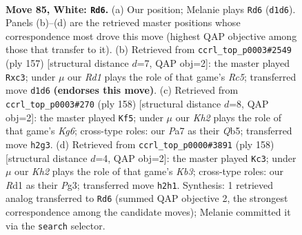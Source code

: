 \documentclass[11pt]{article}
\begin{document}
\clearpage

\begin{figure}[p]\centering
\begin{subfigure}{0.46\textwidth}\centering
\resizebox{\linewidth}{!}{%
\newchessgame
\chessboard[
  setfen={5rk1/P7/8/8/8/8/7K/3R4 w - - 39 85},
  showmover=false,
  pgfstyle=straightmove, color=movearrow, markmove={d1-d6}
]}
\caption{}
\end{subfigure}\hfill
\begin{subfigure}{0.46\textwidth}\centering
\resizebox{\linewidth}{!}{%
\newchessgame
\chessboard[
  setfen={5k2/8/8/7p/2r5/2P5/5KR1/8 b - - 0 79},
  showmover=false,
  pgfstyle=straightmove, color=movearrow, markmove={c4-c3}
]}
\caption{}
\end{subfigure}
\\[4pt]
\begin{subfigure}{0.46\textwidth}\centering
\resizebox{\linewidth}{!}{%
\newchessgame
\chessboard[
  setfen={8/8/6K1/1Q6/3kr3/8/8/8 w - - 17 80},
  showmover=false,
  pgfstyle=straightmove, color=movearrow, markmove={g6-f5}
]}
\caption{}
\end{subfigure}\hfill
\begin{subfigure}{0.46\textwidth}\centering
\resizebox{\linewidth}{!}{%
\newchessgame
\chessboard[
  setfen={2R5/7r/7k/5p2/8/1K4P1/8/8 w - - 7 80},
  showmover=false,
  pgfstyle=straightmove, color=movearrow, markmove={b3-c3}
]}
\caption{}
\end{subfigure}
\caption{\textbf{Move 85, White: \texttt{Rd6}.} (a) Our position; Melanie plays \texttt{Rd6} (\texttt{d1d6}). Panels (b)--(d) are the retrieved master positions whose correspondence most drove this move (highest QAP objective among those that transfer to it). (b) Retrieved from \texttt{ccrl\_top\_p0003\#2549} (ply 157) [structural distance $d$=7, QAP obj=2]: the master played \texttt{Rxc3}; under $\mu$ our \emph{Rd1} plays the role of that game's \emph{Rc5}; transferred move \texttt{d1d6} \textbf{(endorses this move)}. (c) Retrieved from \texttt{ccrl\_top\_p0003\#270} (ply 158) [structural distance $d$=8, QAP obj=2]: the master played \texttt{Kf5}; under $\mu$ our \emph{Kh2} plays the role of that game's \emph{Kg6}; cross-type roles: our \emph{P}a7 as their \emph{Q}b5; transferred move \texttt{h2g3}. (d) Retrieved from \texttt{ccrl\_top\_p0000\#3891} (ply 158) [structural distance $d$=4, QAP obj=2]: the master played \texttt{Kc3}; under $\mu$ our \emph{Kh2} plays the role of that game's \emph{Kb3}; cross-type roles: our \emph{R}d1 as their \emph{P}g3; transferred move \texttt{h2h1}. Synthesis: 1 retrieved analog transferred to \texttt{Rd6} (summed QAP objective 2, the strongest correspondence among the candidate moves); Melanie committed it via the \texttt{search} selector.}
\label{fig:thought-m168}
\end{figure}
\end{document}
